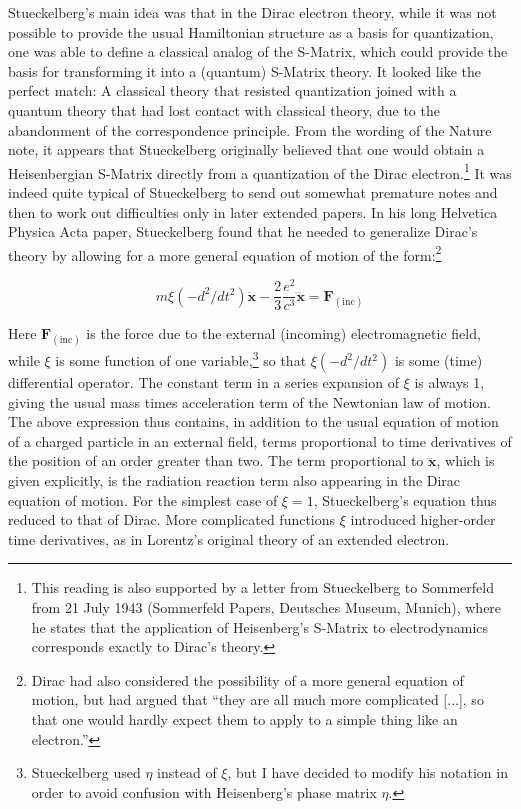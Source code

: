 \documentclass[12pt]{article}
\begin{document}
Stueckelberg's main idea was that in the Dirac electron theory, while it was not possible to provide the usual Hamiltonian structure as a basis for quantization, one was able to define a classical analog of the S-Matrix, which could provide the basis for transforming it into a (quantum) S-Matrix theory. It looked like the perfect match: A classical theory that resisted quantization joined with a quantum theory that had lost contact with classical theory, due to the abandonment of the correspondence principle. From the wording of the Nature note, it appears that Stueckelberg originally believed that one would obtain a Heisenbergian S-Matrix directly from a quantization of the Dirac electron.\footnote{This reading is also supported by a letter from Stueckelberg to Sommerfeld from 21 July 1943 (Sommerfeld Papers, Deutsches Museum, Munich), where he states that the application of Heisenberg's S-Matrix to electrodynamics corresponds exactly to Dirac's theory.} It was indeed quite typical of Stueckelberg to send out somewhat premature notes and then to work out difficulties only in later extended papers. In his long Helvetica Physica Acta paper, Stueckelberg found that he needed to generalize Dirac's theory by allowing for a more general equation of motion of the form:\footnote{Dirac had also considered the possibility of a more general equation of motion, but had argued that ``they are all much more complicated [...], so that one would hardly expect them to apply to a simple thing like an electron.''}

\begin{equation}
\label{eq:models}
m \xi \left( - d^2/dt^2 \right) \ddot{\mathbf{x}} - \frac{2}{3} \frac{e^2}{c^3} \dddot{\mathbf{x}} = \mathbf{F}_{(\mathrm{inc})}
\end{equation}

Here $\mathbf{F}_{(\mathrm{inc})}$ is the force due to the external (incoming) electromagnetic field, while $\xi$ is some function of one variable,\footnote{Stueckelberg used $\eta$ instead of $\xi$, but I have decided to modify his notation in order to avoid confusion with Heisenberg's phase matrix $\eta$.} so that $\xi \left( - d^2/dt^2 \right)$ is some (time) differential operator. The constant term in a series expansion of $\xi$ is always 1, giving the usual mass times acceleration term of the Newtonian law of motion. The above expression thus contains, in addition to the usual equation of motion of a charged particle in an external field, terms proportional to time derivatives of the position of an order greater than two. The term proportional to $\dddot{\mathbf{x}}$, which is given explicitly, is the radiation reaction term also appearing in the Dirac equation of motion. For the simplest case of $\xi = 1$, Stueckelberg's equation thus reduced to that of Dirac. More complicated functions $\xi$ introduced higher-order time derivatives, as in Lorentz's original theory of an extended electron.
\end{document}

